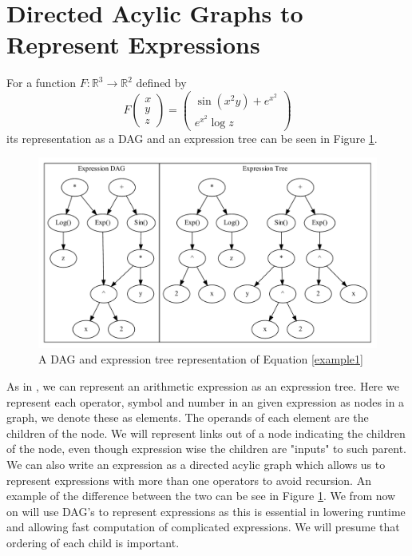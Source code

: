 \documentclass{article}
\begin{document}
\section{Directed Acylic Graphs to Represent Expressions}

For a function $F: \mathbb{R}^3 \rightarrow \mathbb{R}^2$ defined by
\begin{equation} \label{example1}
    F \begin{pmatrix}
        x \\ y \\ z
    \end{pmatrix} = \begin{pmatrix}
        \sin (x^2 y) + e^{x^2} \\ e^{x^2} \log z
    \end{pmatrix}
\end{equation}
its representation as a DAG and an expression tree can be seen in Figure \ref{fig:DAGgraph2}.

\begin{figure}[h]
    \centering
    \includegraphics[width=12cm]{images/Clustergraph.gv.pdf}
    \caption{A DAG and expression tree representation of Equation \ref{example1}}
    \label{fig:DAGgraph2}
\end{figure}

As in \cite{PoPBook}, we can represent an arithmetic expression as an expression tree. Here we represent each operator, symbol and number in an given expression as nodes in a graph, we denote these as elements. The operands of each element are the children of the node. We will represent links out of a node indicating the children of the node, even though expression wise the children are "inputs" to such parent. We can also write an expression as a directed acylic graph which allows us to represent expressions with more than one operators to avoid recursion. An example of the difference between the two can be see in Figure \ref{fig:DAGgraph2}. We from now on will use DAG's to represent expressions as this is essential in lowering runtime and allowing fast computation of complicated expressions. We will presume that ordering of each child is important.
\end{document}
